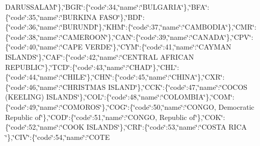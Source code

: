 \begin{DoxyCompactItemize}
D\-A\-R\-U\-S\-S\-A\-L\-A\-M\char`\"{}\},\char`\"{}B\-G\-R\char`\"{}\-:\{\char`\"{}code\char`\"{}\-:34,\char`\"{}name\char`\"{}\-:\char`\"{}B\-U\-L\-G\-A\-R\-I\-A\char`\"{}\},\char`\"{}B\-F\-A\char`\"{}\-:\{\char`\"{}code\char`\"{}\-:35,\char`\"{}name\char`\"{}\-:\char`\"{}B\-U\-R\-K\-I\-N\-A F\-A\-S\-O\char`\"{}\},\char`\"{}B\-D\-I\char`\"{}\-:\{\char`\"{}code\char`\"{}\-:36,\char`\"{}name\char`\"{}\-:\char`\"{}B\-U\-R\-U\-N\-D\-I\char`\"{}\},\char`\"{}K\-H\-M\char`\"{}\-:\{\char`\"{}code\char`\"{}\-:37,\char`\"{}name\char`\"{}\-:\char`\"{}C\-A\-M\-B\-O\-D\-I\-A\char`\"{}\},\char`\"{}C\-M\-R\char`\"{}\-:\{\char`\"{}code\char`\"{}\-:38,\char`\"{}name\char`\"{}\-:\char`\"{}C\-A\-M\-E\-R\-O\-O\-N\char`\"{}\},\char`\"{}C\-A\-N\char`\"{}\-:\{\char`\"{}code\char`\"{}\-:39,\char`\"{}name\char`\"{}\-:\char`\"{}C\-A\-N\-A\-D\-A\char`\"{}\},\char`\"{}C\-P\-V\char`\"{}\-:\{\char`\"{}code\char`\"{}\-:40,\char`\"{}name\char`\"{}\-:\char`\"{}C\-A\-P\-E V\-E\-R\-D\-E\char`\"{}\},\char`\"{}C\-Y\-M\char`\"{}\-:\{\char`\"{}code\char`\"{}\-:41,\char`\"{}name\char`\"{}\-:\char`\"{}C\-A\-Y\-M\-A\-N I\-S\-L\-A\-N\-D\-S\char`\"{}\},\char`\"{}C\-A\-F\char`\"{}\-:\{\char`\"{}code\char`\"{}\-:42,\char`\"{}name\char`\"{}\-:\char`\"{}C\-E\-N\-T\-R\-A\-L A\-F\-R\-I\-C\-A\-N R\-E\-P\-U\-B\-L\-I\-C\char`\"{}\},\char`\"{}T\-C\-D\char`\"{}\-:\{\char`\"{}code\char`\"{}\-:43,\char`\"{}name\char`\"{}\-:\char`\"{}C\-H\-A\-D\char`\"{}\},\char`\"{}C\-H\-L\char`\"{}\-:\{\char`\"{}code\char`\"{}\-:44,\char`\"{}name\char`\"{}\-:\char`\"{}C\-H\-I\-L\-E\char`\"{}\},\char`\"{}C\-H\-N\char`\"{}\-:\{\char`\"{}code\char`\"{}\-:45,\char`\"{}name\char`\"{}\-:\char`\"{}C\-H\-I\-N\-A\char`\"{}\},\char`\"{}C\-X\-R\char`\"{}\-:\{\char`\"{}code\char`\"{}\-:46,\char`\"{}name\char`\"{}\-:\char`\"{}C\-H\-R\-I\-S\-T\-M\-A\-S I\-S\-L\-A\-N\-D\char`\"{}\},\char`\"{}C\-C\-K\char`\"{}\-:\{\char`\"{}code\char`\"{}\-:47,\char`\"{}name\char`\"{}\-:\char`\"{}C\-O\-C\-O\-S (K\-E\-E\-L\-I\-N\-G) I\-S\-L\-A\-N\-D\-S\char`\"{}\},\char`\"{}C\-O\-L\char`\"{}\-:\{\char`\"{}code\char`\"{}\-:48,\char`\"{}name\char`\"{}\-:\char`\"{}C\-O\-L\-O\-M\-B\-I\-A\char`\"{}\},\char`\"{}C\-O\-M\char`\"{}\-:\{\char`\"{}code\char`\"{}\-:49,\char`\"{}name\char`\"{}\-:\char`\"{}C\-O\-M\-O\-R\-O\-S\char`\"{}\},\char`\"{}C\-O\-G\char`\"{}\-:\{\char`\"{}code\char`\"{}\-:50,\char`\"{}name\char`\"{}\-:\char`\"{}C\-O\-N\-G\-O, Democratic Republic of\char`\"{}\},\char`\"{}C\-O\-D\char`\"{}\-:\{\char`\"{}code\char`\"{}\-:51,\char`\"{}name\char`\"{}\-:\char`\"{}C\-O\-N\-G\-O, Republic of\char`\"{}\},\char`\"{}C\-O\-K\char`\"{}\-:\{\char`\"{}code\char`\"{}\-:52,\char`\"{}name\char`\"{}\-:\char`\"{}C\-O\-O\-K I\-S\-L\-A\-N\-D\-S\char`\"{}\},\char`\"{}C\-R\-I\char`\"{}\-:\{\char`\"{}code\char`\"{}\-:53,\char`\"{}name\char`\"{}\-:\char`\"{}C\-O\-S\-T\-A R\-I\-C\-A \char`\"{}\},\char`\"{}C\-I\-V\char`\"{}\-:\{\char`\"{}code\char`\"{}\-:54,\char`\"{}name\char`\"{}\-:\char`\"{}C\-O\-T\-E 
\end{DoxyCompactItemize}
